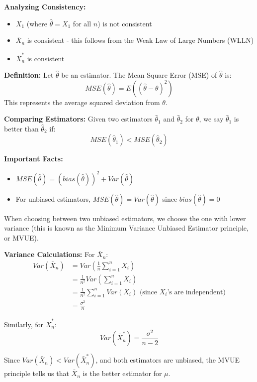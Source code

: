 \documentclass{article}
\begin{document}
   \textbf{Analyzing Consistency:}
   \begin{itemize}
       \item $X_1$ (where $\hat{\theta} = X_1$ for all $n$) is not consistent
       \item $\bar{X}_n$ is consistent - this follows from the Weak Law of Large Numbers (WLLN)
       \item $\bar{X}^*_n$ is consistent
   \end{itemize}

   \textbf{Definition:} Let $\hat{\theta}$ be an estimator. The Mean Square Error (MSE) of $\hat{\theta}$ is:
   \[MSE(\hat{\theta}) = E((\hat{\theta} - \theta)^2)\]
   This represents the average squared deviation from $\theta$.

   \textbf{Comparing Estimators:} Given two estimators $\hat{\theta}_1$ and $\hat{\theta}_2$ for $\theta$, we say $\hat{\theta}_1$ is better than $\hat{\theta}_2$ if:
   \[MSE(\hat{\theta}_1) < MSE(\hat{\theta}_2)\]

   \textbf{Important Facts:}
   \begin{itemize}
       \item $MSE(\hat{\theta}) = (bias(\hat{\theta}))^2 + Var(\hat{\theta})$
       \item For unbiased estimators, $MSE(\hat{\theta}) = Var(\hat{\theta})$ since $bias(\hat{\theta}) = 0$
   \end{itemize}

   When choosing between two unbiased estimators, we choose the one with lower variance (this is known as the Minimum Variance Unbiased Estimator principle, or MVUE).

   \textbf{Variance Calculations:}
   For $\bar{X}_n$:
   \begin{align*}
       Var(\bar{X}_n) &= Var\left(\frac{1}{n}\sum_{i=1}^n X_i\right) \\
       &= \frac{1}{n^2} Var\left(\sum_{i=1}^n X_i\right) \\
       &= \frac{1}{n^2}\sum_{i=1}^n Var(X_i) \text{ (since $X_i$'s are independent)} \\
       &= \frac{\sigma^2}{n}
   \end{align*}

   Similarly, for $\bar{X}^*_n$:
   \[Var(\bar{X}^*_n) = \frac{\sigma^2}{n-2}\]

   Since $Var(\bar{X}_n) < Var(\bar{X}^*_n)$, and both estimators are unbiased, the MVUE principle tells us that $\bar{X}_n$ is the better estimator for $\mu$.
\end{document}
